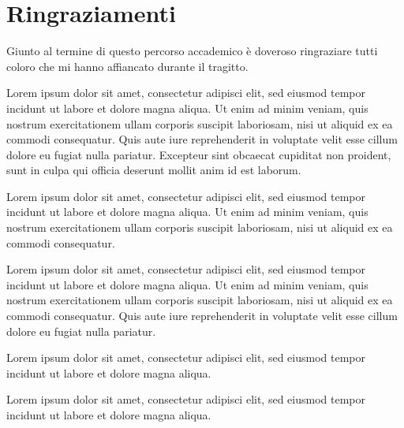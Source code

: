 \chapter*{Ringraziamenti}
Giunto al termine di questo percorso accademico è doveroso ringraziare tutti coloro che mi hanno affiancato durante il tragitto.

\vspace{.4cm}

Lorem ipsum dolor sit amet, consectetur adipisci elit, sed eiusmod tempor incidunt ut labore et dolore magna aliqua. Ut enim ad minim veniam, quis nostrum exercitationem ullam corporis suscipit laboriosam, nisi ut aliquid ex ea commodi consequatur. Quis aute iure reprehenderit in voluptate velit esse cillum dolore eu fugiat nulla pariatur. Excepteur sint obcaecat cupiditat non proident, sunt in culpa qui officia deserunt mollit anim id est laborum.
\vspace{.4cm}

Lorem ipsum dolor sit amet, consectetur adipisci elit, sed eiusmod tempor incidunt ut labore et dolore magna aliqua. Ut enim ad minim veniam, quis nostrum exercitationem ullam corporis suscipit laboriosam, nisi ut aliquid ex ea commodi consequatur.

\vspace{.4cm}

Lorem ipsum dolor sit amet, consectetur adipisci elit, sed eiusmod tempor incidunt ut labore et dolore magna aliqua. Ut enim ad minim veniam, quis nostrum exercitationem ullam corporis suscipit laboriosam, nisi ut aliquid ex ea commodi consequatur. Quis aute iure reprehenderit in voluptate velit esse cillum dolore eu fugiat nulla pariatur.

\vspace{.4cm}

Lorem ipsum dolor sit amet, consectetur adipisci elit, sed eiusmod tempor incidunt ut labore et dolore magna aliqua.

\vspace{.4cm}

Lorem ipsum dolor sit amet, consectetur adipisci elit, sed eiusmod tempor incidunt ut labore et dolore magna aliqua.